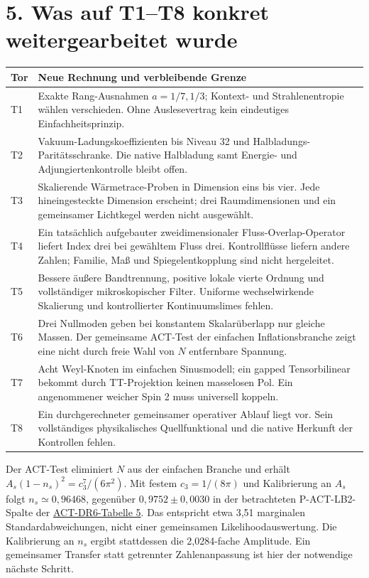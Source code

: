 \section*{5. Was auf T1--T8 konkret weitergearbeitet wurde}
\begin{longtable}{L{10mm}L{140mm}}
\toprule Tor&Neue Rechnung und verbleibende Grenze\\\midrule\endhead
T1&Exakte Rang-Ausnahmen $a=1/7,1/3$; Kontext- und Strahlenentropie wählen verschieden. Ohne Auslesevertrag kein eindeutiges Einfachheitsprinzip.\\
T2&Vakuum-Ladungskoeffizienten bis Niveau 32 und Halbladungs-Paritätsschranke. Die native Halbladung samt Energie- und Adjungiertenkontrolle bleibt offen.\\
T3&Skalierende Wärmetrace-Proben in Dimension eins bis vier. Jede hineingesteckte Dimension erscheint; drei Raumdimensionen und ein gemeinsamer Lichtkegel werden nicht ausgewählt.\\
T4&Ein tatsächlich aufgebauter zweidimensionaler Fluss-Overlap-Operator liefert Index drei bei gewähltem Fluss drei. Kontrollflüsse liefern andere Zahlen; Familie, Maß und Spiegelentkopplung sind nicht hergeleitet.\\
T5&Bessere äußere Bandtrennung, positive lokale vierte Ordnung und vollständiger mikroskopischer Filter. Uniforme wechselwirkende Skalierung und kontrollierter Kontinuumslimes fehlen.\\
T6&Drei Nullmoden geben bei konstantem Skalarüberlapp nur gleiche Massen. Der gemeinsame ACT-Test der einfachen Inflationsbranche zeigt eine nicht durch freie Wahl von $N$ entfernbare Spannung.\\
T7&Acht Weyl-Knoten im einfachen Sinusmodell; ein gapped Tensorbilinear bekommt durch TT-Projektion keinen masselosen Pol. Ein angenommener weicher Spin 2 muss universell koppeln.\\
T8&Ein durchgerechneter gemeinsamer operativer Ablauf liegt vor. Sein vollständiges physikalisches Quellfunktional und die native Herkunft der Kontrollen fehlen.\\\bottomrule
\end{longtable}

Der ACT-Test eliminiert $N$ aus der einfachen Branche und erhält $A_s(1-n_s)^2=c_3^7/(6\pi^2)$. Mit festem $c_3=1/(8\pi)$ und Kalibrierung an $A_s$ folgt $n_s\simeq0{,}96468$, gegenüber $0{,}9752\pm0{,}0030$ in der betrachteten P-ACT-LB2-Spalte der \href{https://arxiv.org/abs/2503.14452v2}{ACT-DR6-Tabelle 5}. Das entspricht etwa 3,51 marginalen Standardabweichungen, nicht einer gemeinsamen Likelihoodauswertung. Die Kalibrierung an $n_s$ ergibt stattdessen die 2,0284-fache Amplitude. Ein gemeinsamer Transfer statt getrennter Zahlenanpassung ist hier der notwendige nächste Schritt.

